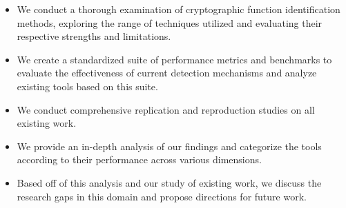 \begin{itemize}[noitemsep,topsep=0pt]


\item We conduct a thorough examination of cryptographic function identification methods, exploring the range of techniques utilized and evaluating their respective strengths and limitations.



\item We create a standardized suite of performance metrics and benchmarks to evaluate the effectiveness
of current detection mechanisms and analyze existing tools based on this suite.

\item We conduct comprehensive replication and reproduction studies on all existing work.

\item We provide an in-depth analysis of our findings and categorize the tools according to their performance across various dimensions.

\item Based off of this analysis and our study of existing work, we discuss the research gaps in this domain and propose directions for future work.

  

\end{itemize}

